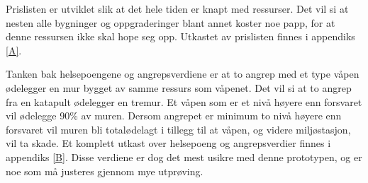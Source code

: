 Prislisten er utviklet slik at det hele tiden er knapt med ressurser. Det vil si at nesten alle bygninger og oppgraderinger blant annet koster noe papp, for at denne ressursen ikke skal hope seg opp. Utkastet av prislisten finnes i appendiks \ref{A}.

Tanken bak helsepoengene og angrepsverdiene er at to angrep med et type våpen ødelegger en mur bygget av samme ressurs som våpenet. Det vil si at to angrep fra en katapult ødelegger en tremur. Et våpen som er et nivå høyere enn forsvaret vil ødelegge 90\% av muren. Dersom angrepet er minimum to nivå høyere enn forsvaret vil muren bli totalødelagt i tillegg til at våpen, og videre miljøstasjon, vil ta skade. Et komplett utkast over helsepoeng og angrepsverdier finnes i appendiks \ref{B}. Disse verdiene er dog det mest usikre med denne prototypen, og er noe som må justeres gjennom mye utprøving.

